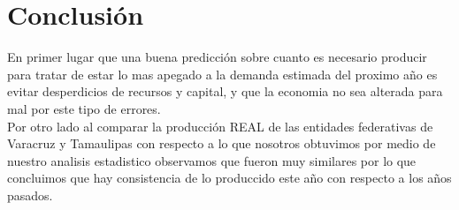 \newpage
\section*{Conclusión}
En primer lugar que una buena predicción sobre cuanto es necesario producir para tratar de estar lo mas apegado a la demanda estimada del proximo año es evitar desperdicios de recursos y capital, y que la economia no sea alterada para mal por este tipo de errores. \\
Por otro lado al comparar la producción REAL de las entidades federativas de Varacruz y Tamaulipas con respecto a lo que nosotros obtuvimos por medio de nuestro analisis estadistico observamos que fueron muy similares por lo que concluimos que hay consistencia de lo produccido este año con respecto a los años pasados. 



